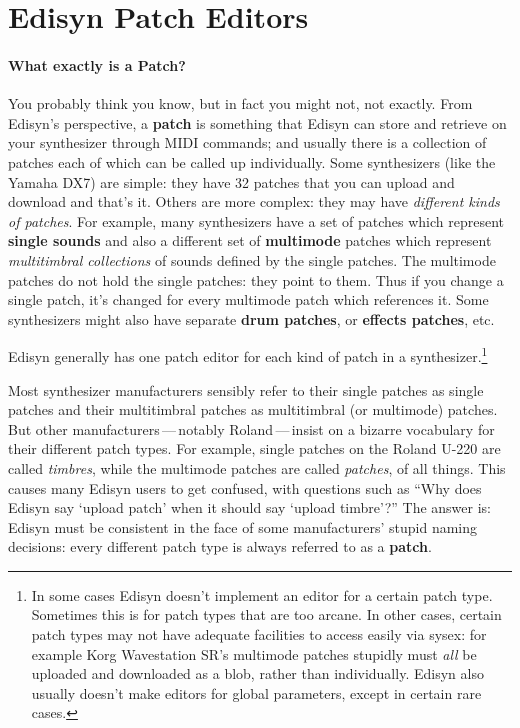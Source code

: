 \documentclass{article}
\begin{document}
\section{Edisyn Patch Editors}

\paragraph{What exactly is a Patch?}  You probably think you know, but in fact you might not, not exactly.  From Edisyn's perspective, a {\bf patch} is something that Edisyn can store and retrieve on your synthesizer through MIDI commands; and usually there is a collection of patches each of which can be called up individually.  Some synthesizers (like the Yamaha DX7) are simple: they have 32 patches that you can upload and download and that's it.  Others are more complex: they may have {\it different kinds of patches}.  For example, many synthesizers have a set of patches which represent {\bf single sounds} and also a different set of {\bf multimode} patches which represent {\it multitimbral collections} of sounds defined by the single patches.  The multimode patches do not hold the single patches: they point to them.  Thus if you change a single patch, it's changed for every multimode patch which references it.  Some synthesizers might also have separate {\bf drum patches}, or {\bf effects patches}, etc.

Edisyn generally has one patch editor for each kind of patch in a synthesizer.\footnote{In some cases Edisyn doesn't implement an editor for a certain patch type.  Sometimes this is for patch types that are too arcane.  In other cases, certain patch types may not have adequate facilities to access easily via sysex: for example Korg Wavestation SR's multimode patches stupidly must {\it all} be uploaded and downloaded as a blob, rather than individually.  Edisyn also usually doesn't make editors for global parameters, except in certain rare cases.}

Most synthesizer manufacturers sensibly refer to their single patches as single patches and their multitimbral patches as multitimbral (or multimode) patches.  But other manufacturers\,---\,notably Roland\,---\,insist on a bizarre vocabulary for their different patch types.  For example, single patches on the Roland U-220 are called {\it timbres}, while the multimode patches are called {\it patches}, of all things.  This causes many Edisyn users to get confused, with questions such as ``Why does Edisyn say `upload patch' when it should say `upload timbre'?''  The answer is: Edisyn must be consistent in the face of some manufacturers' stupid naming decisions: every different patch type is always referred to as a {\bf patch}.
\end{document}
